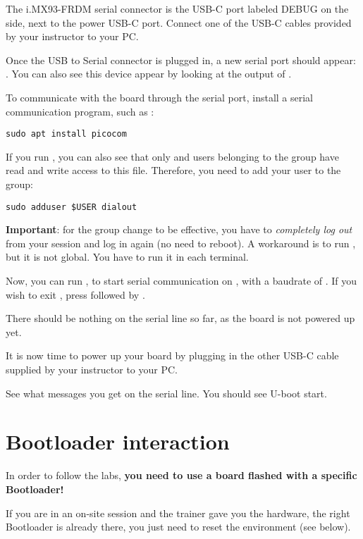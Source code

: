 The i.MX93-FRDM serial connector is the USB-C port labeled DEBUG on the
side, next to the power USB-C port. Connect one of the USB-C
cables provided by your instructor to your PC.

Once the USB to Serial connector is plugged in, a new serial port
should appear: . You can also see this device
appear by looking at the output of .

To communicate with the board through the serial port, install a
serial communication program, such as :

\begin{verbatim}
sudo apt install picocom
\end{verbatim}

If you run , you can also see that only
 and users belonging to the  group have
read and write access to this file. Therefore, you need to add your user
to the  group:

\begin{verbatim}
sudo adduser $USER dialout
\end{verbatim}

{\bf Important}: for the group change to be effective, you have to
{\em completely log out} from your session and log in again (no need to
reboot). A workaround is to run , but it is not
global.
You have to run it in each terminal.

Now, you can run , to start serial
communication on , with a baudrate of . If
you wish to exit , press \code{[Ctrl][a]} followed by
\code{[Ctrl][x]}.

There should be nothing on the serial line so far, as the board is not
powered up yet.

It is now time to power up your board by plugging in the other USB-C
cable supplied by your instructor to your PC.

See what messages you get on the serial line. You should see U-boot
start.

\section{Bootloader interaction}

In order to follow the labs, {\bf you need to use a board flashed
with a specific Bootloader!}

If you are in an on-site session and the trainer gave you the hardware,
the right Bootloader is already there, you just need to reset the
environment (see below).

